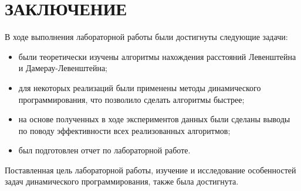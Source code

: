 \chapter*{ЗАКЛЮЧЕНИЕ}

В ходе выполнения лабораторной работы были достигнуты следующие задачи:

\begin{itemize}
    \item были теоретически изучены алгоритмы нахождения расстояний Левенштейна и Дамерау-Левенштейна;
    \item для некоторых реализаций были применены методы динамического программирования, что позволило сделать алгоритмы быстрее;
    \item на основе полученных в ходе экспериментов данных были сделаны выводы по поводу эффективности всех реализованных алгоритмов;
    \item был подготовлен отчет по лабораторной работе.
\end{itemize}

Поставленная цель лабораторной работы, изучение и исследование особенностей задач динамического программирования, также была достигнута.
